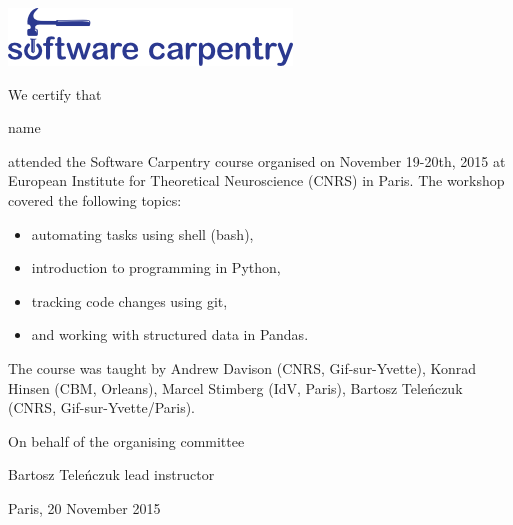\documentclass[a4paper,12pt]{article}
\begin{document}
\thispagestyle{empty}
\begin{center}
\includegraphics{software-carpentry-banner.png}
\vspace{2.5cm}
\end{center}

We certify that

\vspace{1cm}

\begin{center}

    {\Large {{ name }}}

\end{center}

\vspace{1cm}

\noindent attended the Software Carpentry course organised on November 19-20th, 2015 at European Institute for Theoretical Neuroscience (CNRS) in Paris. The workshop covered the following topics:

\begin{itemize}
    \item automating tasks using shell (bash),
    \item introduction to programming in Python,
    \item tracking code changes using git,
    \item and working with structured data in Pandas.
\end{itemize} 

The course was taught by Andrew Davison (CNRS, Gif-sur-Yvette), Konrad Hinsen (CBM, Orleans), Marcel Stimberg (IdV, Paris), Bartosz Teleńczuk (CNRS, Gif-sur-Yvette/Paris).

\vspace{1cm}


\noindent On behalf of the organising committee

\vspace{2cm}

\noindent Bartosz Tele\'{n}czuk \newline
lead instructor

\vspace{1cm}

\noindent Paris, 20 November 2015 
\end{document}
